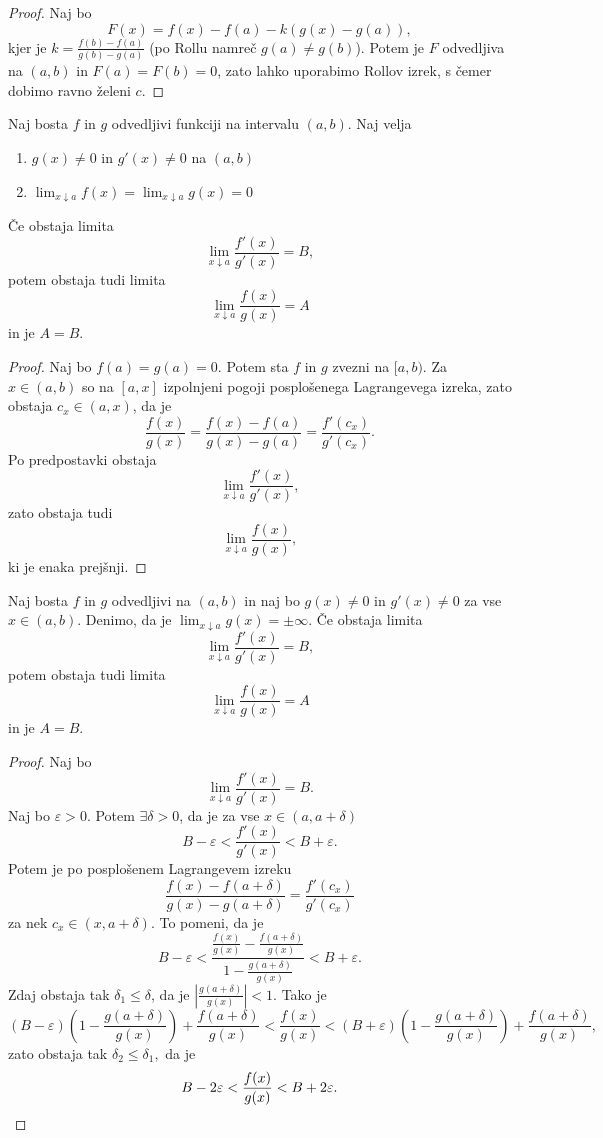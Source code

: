 \documentclass[12pt, a4paper]{article}
\begin{document}
\begin{proof}
Naj bo
\[
F(x)=f(x)-f(a)-k(g(x)-g(a)),
\]
kjer je $k=\frac{f(b)-f(a)}{g(b)-g(a)}$ (po Rollu namreč $g(a)\ne g(b)$). Potem je $F$ odvedljiva na $(a,b)$ in $F(a)=F(b)=0$, zato lahko uporabimo Rollov izrek, s čemer dobimo ravno želeni $c$.
\end{proof}

\begin{izrek}[L'Hôpital]
Naj bosta $f$ in $g$ odvedljivi funkciji na intervalu $(a,b)$. Naj velja

\begin{enumerate}[label=\roman*)]
\item $g(x)\ne 0$ in $g'(x)\ne 0$ na $(a,b)$
\item $\displaystyle\lim_{x\downarrow a}f(x)=\lim_{x\downarrow a}g(x)=0$
\end{enumerate}
Če obstaja limita
\[
\lim_{x\downarrow a}\frac{f'(x)}{g'(x)}=B,
\]
potem obstaja tudi limita
\[
\lim_{x\downarrow a}\frac{f(x)}{g(x)}=A
\]
in je $A=B$.
\end{izrek}

\begin{proof}
Naj bo $f(a)=g(a)=0$. Potem sta $f$ in $g$ zvezni na $[a,b)$. Za $x\in(a,b)$ so na $[a,x]$ izpolnjeni pogoji posplošenega Lagrangevega izreka, zato obstaja $c_x\in(a,x)$, da je
\[
\frac{f(x)}{g(x)}=\frac{f(x)-f(a)}{g(x)-g(a)}=\frac{f'(c_x)}{g'(c_x)}.
\]
Po predpostavki obstaja
\[
\lim_{x\downarrow a}\frac{f'(x)}{g'(x)},
\]
zato obstaja tudi
\[
\lim_{x\downarrow a}\frac{f(x)}{g(x)},
\]
ki je enaka prejšnji.
\end{proof}

\begin{izrek}
Naj bosta $f$ in $g$ odvedljivi na $(a,b)$ in naj bo $g(x)\ne 0$ in $g'(x)\ne 0$ za vse $x\in(a,b)$. Denimo, da je $\displaystyle\lim_{x\downarrow a}g(x)=\pm\infty$. Če obstaja limita
\[
\lim_{x\downarrow a}\frac{f'(x)}{g'(x)}=B,
\]
potem obstaja tudi limita
\[
\lim_{x\downarrow a}\frac{f(x)}{g(x)}=A
\]
in je $A=B$.
\end{izrek}

\begin{proof}
Naj bo
\[
\lim_{x\downarrow a}\frac{f'(x)}{g'(x)}=B.
\]
Naj bo $\varepsilon>0$. Potem $\exists\delta>0$, da je za vse $x\in(a,a+\delta)$
\[
B-\varepsilon<\frac{f'(x)}{g'(x)}<B+\varepsilon.
\]
Potem je po posplošenem Lagrangevem izreku
\[
\frac{f(x)-f(a+\delta)}{g(x)-g(a+\delta)}=\frac{f'(c_x)}{g'(c_x)}
\]
za nek $c_x\in(x,a+\delta)$. To pomeni, da je
\[
B-\varepsilon<\frac{\frac{f(x)}{g(x)}-\frac{f(a+\delta)}{g(x)}}{1-\frac{g(a+\delta)}{g(x)}}<B+\varepsilon.
\]
Zdaj obstaja tak $\delta_1\leq\delta$, da je $\left|\frac{g(a+\delta)}{g(x)}\right|<1$. Tako je
\[
(B-\varepsilon)\left(1-\frac{g(a+\delta)}{g(x)}\right)+\frac{f(a+\delta)}{g(x)}<\frac{f(x)}{g(x)}<(B+\varepsilon)\left(1-\frac{g(a+\delta)}{g(x)}\right)+\frac{f(a+\delta)}{g(x)},
\]
zato obstaja tak $\delta_2\leq\delta_1,$ da je
\[
B-2\varepsilon<\frac{f(x)}{g(x)}<B+2\varepsilon.\qedhere
\]
\end{proof}
\end{document}
